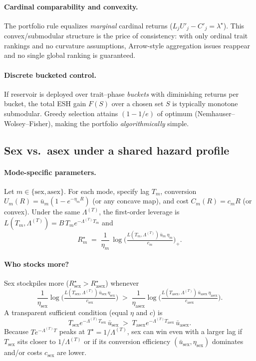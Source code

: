 \documentclass[11pt]{article}
\theoremstyle{upright}
\newcommand{\hazT}[1]{\Lambda^{(#1)}}          %
\begin{document}
\paragraph{Cardinal comparability and convexity.}
The portfolio rule equalizes \emph{marginal} cardinal returns ($L_j U'_j - C'_j=\lambda^{\star}$).
This convex/submodular structure is the price of consistency: with only ordinal trait rankings
and no curvature assumptions, Arrow-style aggregation issues reappear and no single global ranking
is guaranteed.

\paragraph{Discrete bucketed control.}
If reservoir is deployed over trait–phase \emph{buckets} with diminishing returns per bucket, the total ESH gain $F(S)$ over a chosen set $S$ is typically monotone submodular. Greedy selection attains $(1-1/e)$ of optimum (Nemhauser–Wolsey–Fisher), making the portfolio \emph{algorithmically} simple.

\subsection{Sex vs.\ asex under a shared hazard profile}
\paragraph{Mode-specific parameters.}
Let $m\in\{\mathrm{sex},\mathrm{asex}\}$. For each mode, specify lag $T_m$, conversion $U_m(R)=\bar u_m(1-e^{-\eta_m R})$ (or any concave map), and cost $C_m(R)=c_m R$ (or convex). Under the same $\hazT{T}$, the first-order leverage is $L(T_m,\hazT{T})=B\,T_m e^{-\hazT{T}T_m}$ and
\[
R^\star_m \;=\; \frac{1}{\eta_m}\,\log\!\Big(\tfrac{L(T_m,\hazT{T})\,\bar u_m\,\eta_m}{c_m}\Big)_{+}.
\]

\paragraph{Who stocks more?}
Sex stockpiles more ($R^\star_{\mathrm{sex}}>R^\star_{\mathrm{asex}}$) whenever
\[
\frac{1}{\eta_{\mathrm{sex}}}\log\!\Big(\tfrac{L(T_{\mathrm{sex}},\hazT{T})\,\bar u_{\mathrm{sex}}\,\eta_{\mathrm{sex}}}{c_{\mathrm{sex}}}\Big)\;>\;
\frac{1}{\eta_{\mathrm{asex}}}\log\!\Big(\tfrac{L(T_{\mathrm{asex}},\hazT{T})\,\bar u_{\mathrm{asex}}\,\eta_{\mathrm{asex}}}{c_{\mathrm{asex}}}\Big).
\]
A transparent sufficient condition (equal $\eta$ and $c$) is
\[
T_{\mathrm{sex}} e^{-\hazT{T}T_{\mathrm{sex}}}\,\bar u_{\mathrm{sex}}
\;>\;
T_{\mathrm{asex}} e^{-\hazT{T}T_{\mathrm{asex}}}\,\bar u_{\mathrm{asex}}.
\]
Because $T e^{-\hazT{T}T}$ peaks at $T^\star=1/\hazT{T}$, sex can win even with a larger lag if $T_{\mathrm{sex}}$ sits closer to $1/\hazT{T}$ or if its conversion efficiency $(\bar u_{\mathrm{sex}},\eta_{\mathrm{sex}})$ dominates and/or costs $c_{\mathrm{sex}}$ are lower.
\end{document}
